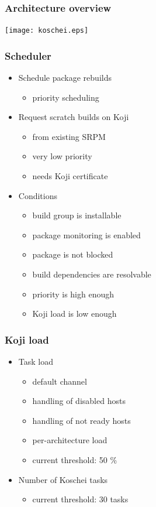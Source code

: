 \documentclass[pdftex,unicode,xcolor=table]{beamer}
\begin{document}
\begin{frame}[fragile]
  \frametitle{Architecture overview}
  \begin{center}
    \texttt{[image: koschei.eps]}
  \end{center}
\end{frame}

\begin{frame}
  \frametitle{Scheduler}
  \begin{itemize}
    \item Schedule package rebuilds
    \begin{itemize}
      \item priority scheduling
    \end{itemize}
    \item Request scratch builds on Koji
    \begin{itemize}
      \item from existing SRPM
      \item very low priority
      \item needs Koji certificate
    \end{itemize}
    \item Conditions
    \begin{itemize}
      \item build group is installable
      \item package monitoring is enabled
      \item package is not blocked
      \item build dependencies are resolvable
      \item priority is high enough
      \item Koji load is low enough
    \end{itemize}
  \end{itemize}
\end{frame}

\begin{frame}
  \frametitle{Koji load}
  \begin{itemize}
    \item Task load
    \begin{itemize}
      \item default channel
      \item handling of disabled hosts
      \item handling of not ready hosts
      \item per-architecture load
      \item current threshold: 50 \%
    \end{itemize}
    \item Number of Koschei tasks
    \begin{itemize}
      \item current threshold: 30 tasks
    \end{itemize}
  \end{itemize}
\end{frame}
\end{document}
